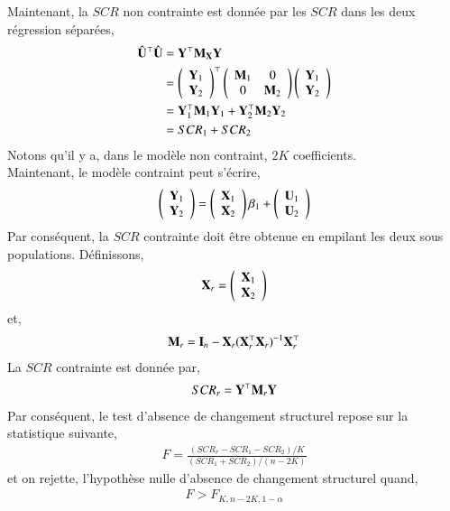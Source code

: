 \documentclass[10pt, reqno]{amsart}
\begin{document}
Maintenant, la $SCR$ non contrainte est donnée par les $SCR$ dans les deux régression séparées,
\begin{align*}
\hat{\mathbf U}^\top\hat{\mathbf U} &= \mathbf Y^\top\mathbf M_\mathbf X\mathbf Y\\
&=
\left(
\begin{array}{c}
\mathbf Y_1\\
\mathbf Y_2
\end{array}
\right)^\top
\left(
\begin{array}{cc}
\mathbf M_1&0\\
0&\mathbf M_2
\end{array}
\right)
\left(
\begin{array}{c}
\mathbf Y_1\\
\mathbf Y_2
\end{array}
\right)
\\
&= \mathbf Y_1^\top\mathbf M_1\mathbf Y_1 + \mathbf Y_2^\top\mathbf M_2\mathbf Y_2\\
&=SCR_1 +SCR_2
\end{align*}
Notons qu'il y a, dans le modèle non contraint, $2K$ coefficients.\\
Maintenant, le modèle contraint peut s'écrire,
\begin{align}
\left(
\begin{array}{c}
\mathbf Y_1\\
\mathbf Y_2
\end{array}
\right)
=
\left(
\begin{array}{c}
\mathbf X_1\\
\mathbf X_2
\end{array}
\right)\beta_1
+
\left(
\begin{array}{c}
\mathbf U_1\\
\mathbf U_2
\end{array}
\right)
\label{eq52}
\end{align}
Par conséquent, la $SCR$ contrainte doit être obtenue en empilant les deux sous populations. Définissons,
\begin{align*}
\mathbf X_r = \left(\begin{array}{c}
\mathbf X_1\\
\mathbf X_2
\end{array}\right)
\end{align*}
et,
\begin{align*}
\mathbf M_r = \mathbf{I}_n - \mathbf X_r(\mathbf X_r^\top\mathbf X_r)^{-1}\mathbf X_r^\top
\end{align*}
La $SCR$ contrainte est donnée par,
\begin{align*}
SCR_r = \mathbf Y^\top\mathbf M_r\mathbf Y
\end{align*}
Par conséquent, le test d'absence de changement structurel repose sur la statistique suivante,
\begin{align*}
F = \frac{(SCR_r - SCR_1 - SCR_2)/K}{(SCR_1 + SCR_2)/(n-2K)}
\end{align*}
et on rejette, l'hypothèse nulle d'absence de changement structurel quand,
\begin{align*}
F > F_{K, n-2K, 1-\alpha}
\end{align*}
\end{document}
